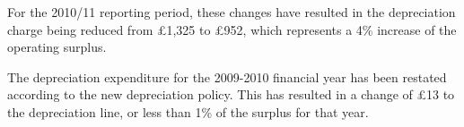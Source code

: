 \begin{enumerate}
        For the 2010/11 reporting period, these changes have resulted in the
        depreciation charge being reduced from £1,325 to £952, which represents a 4\%
        increase of the operating surplus.

        The depreciation expenditure for the 2009-2010 financial year has been restated
        according to the new depreciation policy. This has resulted in a change of £13
        to the depreciation line, or less than 1\% of the surplus for that year.

\end{enumerate}
